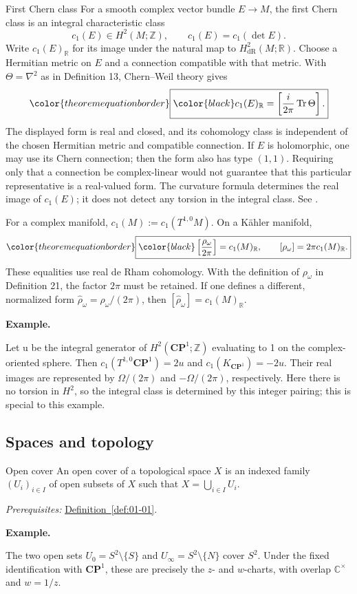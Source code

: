 \documentclass[11pt]{article}
\makeatletter
\newcommand{\R}{\mathbb R}
\newcommand{\C}{\mathbb C}
\newcommand{\cR}{c_1(M)_{\R}}
\newcommand{\theoremboxed}[1]{%
  {\color{theoremequationborder}\boxed{\color{black}#1}}%
}
\newcounter{definition}
\newcommand{\CP}{\mathbf{CP}}
\newcommand{\Z}{\mathbb Z}
\newcommand{\exampleheading}{\par\medskip\textbf{Example.}\par\smallskip}
\newcommand{\currentdefinition}[1]{\protected@edef\@currentlabel{#1}}
\makeatother
\begin{document}
\newpage
\begin{definitionbox}{First Chern class}
\currentdefinition{\thedefinition}
\label{source:S25}
\label{def:B12}
For a smooth complex vector bundle $E\to M$, the first Chern class is
an integral characteristic class
\[
c_1(E)\in H^2(M;\mathbb Z),\qquad c_1(E)=c_1(\det E).
\]
Write $c_1(E)_{\R}$ for its image under the natural map to
$H^2_{\mathrm{dR}}(M;\R)$. Choose a Hermitian metric on $E$ and a
connection compatible with that metric. With $\Theta=\nabla^2$ as in
Definition 13, Chern--Weil theory gives
\[
\theoremboxed{c_1(E)_{\R}
=\left[\frac{i}{2\pi}\operatorname{Tr}\Theta\right].}
\]
The displayed form is real and closed, and its cohomology class is
independent of the chosen Hermitian metric and compatible connection.
If $E$ is holomorphic, one may use its Chern connection; then the form
also has type $(1,1)$.
Requiring only that a connection be complex-linear would not guarantee
that this particular representative is a real-valued form.
The curvature formula determines the real image of $c_1(E)$; it does
not detect any torsion in the integral class. See \cite{demailly}.

For a complex manifold, $c_1(M):=c_1(T^{1,0}M)$. On a K\"ahler manifold,
\[
\theoremboxed{\left[\frac{\rho_\omega}{2\pi}\right]=\cR,
\qquad [\rho_\omega]=2\pi\cR.}
\]
These equalities use real de Rham cohomology. With the definition of
$\rho_\omega$ in Definition 21, the factor $2\pi$ must be retained.
If one defines a different, normalized form
$\widehat\rho_\omega=\rho_\omega/(2\pi)$, then
$[\widehat\rho_\omega]=\cR$.


\exampleheading
Let u be the integral generator of $H^2(\CP^1;\Z)$ evaluating to 1 on the complex-oriented sphere. Then $c_1(T^{1,0}\CP^1)=2u$ and $c_1(K_{\CP^1})=-2u$. Their real images are represented by $\Omega/(2\pi)$ and $-\Omega/(2\pi)$, respectively. Here there is no torsion in $H^2$, so the integral class is determined by this integer pairing; this is special to this example.
\end{definitionbox}


\subsection*{Spaces and topology}

\begin{definitionbox}{Open cover}
\currentdefinition{\thedefinition}
\label{def:01-03}
An open cover of a topological space $X$ is an indexed family $(U_i)_{i\in I}$ of open subsets of $X$ such that $X=\bigcup_{i\in I}U_i$.

\smallskip
\textit{Prerequisites:} \hyperref[def:01-01]{Definition~\ref*{def:01-01}}.

\exampleheading
The two open sets $U_0=S^2\setminus\{S\}$ and $U_\infty=S^2\setminus\{N\}$ cover $S^2$. Under the fixed identification with $\CP^1$, these are precisely the $z$- and $w$-charts, with overlap $\C^\times$ and $w=1/z$.
\end{definitionbox}
\end{document}
